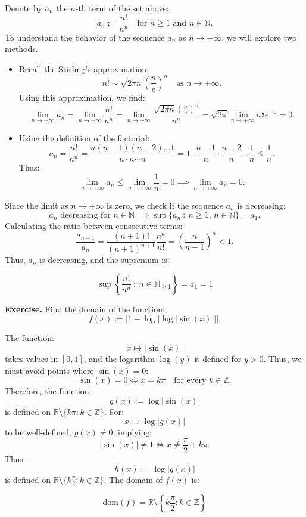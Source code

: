 \documentclass[a4paper,10 pt]{report}
\newcommand{\finalanswer}[1]{%
    \begin{finalAnswer}
    \[
        #1
    \]
    \end{finalAnswer}
}
\theoremstyle{definition}
\begin{document}
\begin{solutionBox}
Denote by $a_n$ the $n$-th term of the set above:
\[
a_n := \frac{n!}{n^n} \quad \text{for $n \geq 1$ and $n \in \mathbb{N}$}.
\]
To understand the behavior of the sequence $a_n$ as $n \to + \infty$, we will explore two methods. 

\begin{itemize}
\item Recall the Stirling's approximation:
\[
n! \sim \sqrt{2 \pi n} \left( \frac{n}{\mathrm{e}} \right)^n \quad \text{as $n \to + \infty$}.
\]
Using this approximation, we find:
\[
\lim_{n \to + \infty} a_n = \lim_{n \to + \infty} \frac{n!}{n^n} = \lim_{n \to + \infty} \frac{\sqrt{2 \pi n} \left( \frac{n}{\mathrm{e}} \right)^n}{n^n} = \sqrt{2 \pi} \lim_{n \to + \infty} n^{\frac{1}{2}} \mathrm{e}^{-n} = 0.
\]
\item Using the definition of the factorial:
\[
a_n = \frac{n!}{n^n} = \frac{n(n-1)(n-2) \dots 1}{n \cdot n \cdots n} = 1 \cdot \frac{n-1}{n} \cdot \frac{n-2}{n} \dots \frac{1}{n} \leq \frac{1}{n}.
\]
Thus:
\[
\lim_{n \to + \infty} a_n \leq \lim_{n \to + \infty} \frac{1}{n} = 0 \implies \lim_{n \to + \infty} a_n = 0.
\]

\end{itemize}
Since the limit as $n \to + \infty$ is zero, we check if the sequence $a_n$ is decreasing:
\[
\text{$a_n$ decreasing for $n \in \mathbb{N}$} \implies \sup \{ a_n \: : \: n \geq 1, \, n \in \mathbb{N} \} = a_1.
\]
Calculating the ratio between consecutive terms:
\[
\frac{a_{n+1}}{a_n} = \frac{(n + 1)!}{(n + 1)^{n + 1}} \frac{n^n}{n!} = \left( \frac{n}{n + 1} \right)^n < 1.
\]
Thus, $a_n$ is decreasing, and the supremum is:
\finalanswer{\sup \left\{ \frac{n!}{n^n} \: : \: n \in \mathbb{N}_{\geq 1} \right\} = a_1 = 1}
\end{solutionBox}

\begin{exerciseBox}
\textbf{Exercise.} Find the domain of the function:
\[
f(x) := \left| 1 - \log \left| \log | \sin(x) | \right| \right|.
\]
\end{exerciseBox}

\begin{solutionBox}
The function:
\[
x \longmapsto | \sin(x) |
\]
takes values in $[0, 1]$, and the logarithm $\log(y)$ is defined for $y > 0$. Thus, we must avoid points where $\sin(x) = 0$:
\[
\sin(x) = 0 \iff x = k \pi \quad \text{for every $k \in \mathbb{Z}$}.
\]
Therefore, the function:
\[
g(x) := \log \left| \sin(x) \right|
\]
is defined on $\mathbb{R} \setminus \{ k \pi : k \in \mathbb{Z} \}$. For:
\[
x \longmapsto \log \left| g(x) \right|
\]
to be well-defined, $g(x) \neq 0$, implying:
\[
|\sin(x)| \neq 1 \iff x \neq \frac{\pi}{2} + k \pi.
\]
Thus:
\[
h(x) := \log \left| g(x) \right|
\]
is defined on $\mathbb{R} \setminus \{ k \frac{\pi}{2} : k \in \mathbb{Z} \}$. The domain of $f(x)$ is:
\finalanswer{\mathrm{dom}(f) = \mathbb{R} \setminus \left\{ k \frac{\pi}{2} : k \in \mathbb{Z} \right\}}
\end{solutionBox}
\end{document}
